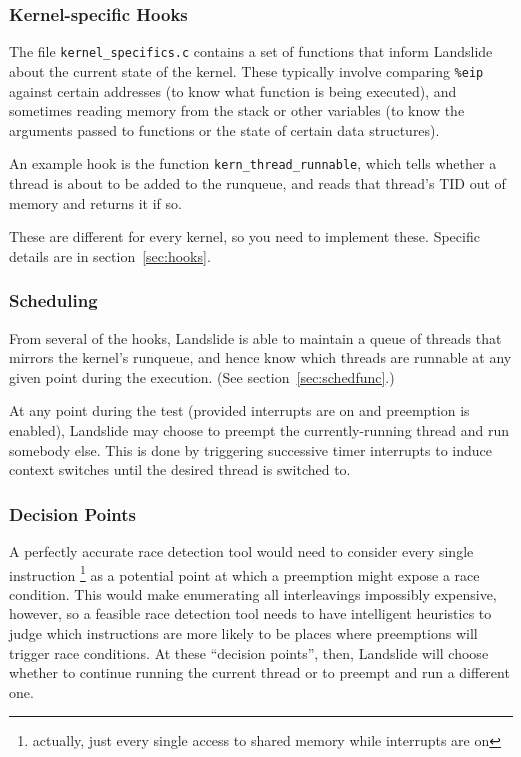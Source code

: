 \documentclass{article}
\begin{document}
\subsubsection{Kernel-specific Hooks}

The file \texttt{kernel\_specifics.c} contains a set of functions that inform Landslide about the current state of the kernel.
These typically involve comparing \texttt{\%eip} against certain addresses (to know what function is being executed), and sometimes reading memory from the stack or other variables (to know the arguments passed to functions or the state of certain data structures).

An example hook is the function \texttt{kern\_thread\_runnable}, which tells whether a thread is about to be added to the runqueue, and reads that thread's TID out of memory and returns it if so.

These are different for every kernel, so you need to implement these. Specific details are in section~\ref{sec:hooks}.

\subsubsection{Scheduling}

From several of the hooks, Landslide is able to maintain a queue of threads that mirrors the kernel's runqueue, and hence know which threads are runnable at any given point during the execution. (See section~\ref{sec:schedfunc}.)

At any point during the test (provided interrupts are on and preemption is enabled), Landslide may choose to preempt the currently-running thread and run somebody else.
This is done by triggering successive timer interrupts to induce context switches until the desired thread is switched to.

\subsubsection{Decision Points}

A perfectly accurate race detection tool would need to consider every single instruction
\footnote{actually, just every single access to shared memory while interrupts are on}
as a potential point at which a preemption might expose a race condition.
This would make enumerating all interleavings impossibly expensive, however, so a feasible race detection tool needs to have intelligent heuristics to judge which instructions are more likely to be places where preemptions will trigger race conditions. At these ``decision points'', then, Landslide will choose whether to continue running the current thread or to preempt and run a different one.
\end{document}
